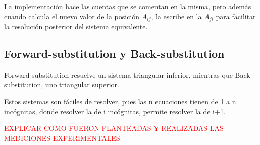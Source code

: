 La implementaci\'on hace las cuentas que se comentan en la misma, pero adem\'as cuando calcula el nuevo valor de la posici\'on $A_{ij}$, la escribe en la $A_{ji}$ para facilitar la resoluci\'on posterior del sistema equivalente.

\subsection{Forward-substitution y Back-substitution}
Forward-substitution resuelve un sistema triangular inferior, mientras que Back-substitution, uno triangular superior.

Estos sistemas son f\'aciles de resolver, pues las n ecuaciones tienen de 1 a n inc\'ognitas, donde resolver la de i inc\'ognitas, permite resolver la de i+1.

\textcolor{red}{EXPLICAR COMO FUERON PLANTEADAS Y REALIZADAS LAS MEDICIONES EXPERIMENTALES}